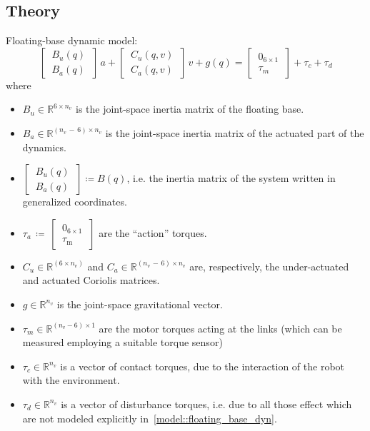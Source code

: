 \documentclass[letterpaper, 10 pt, conference]{ieeeconf}  %
\begin{document}
\subsection{Theory}
Floating-base dynamic model:
\begin{equation}\label{model::floating_base_dyn}
\begin{bmatrix}
~B_u(q)~\\
~B_a(q)~
\end{bmatrix}\,a + \begin{bmatrix}
~C_u(q, v)~\\
~C_a(q, v)~
\end{bmatrix}\,v + g(q) = \begin{bmatrix}
~0_{6\times 1}~\\
~\tau_{m}~
\end{bmatrix} + \tau_{c} + \tau_{d}
\end{equation}
where
\begin{itemize}
\item $B_u\in\mathbb{R}^{6\times n_v}$ is the joint-space inertia matrix of the floating base.
\item $B_a\in\mathbb{R}^{\left(n_v\,-\,6\right)\times n_v}$ is the joint-space inertia matrix of the actuated part of the dynamics.
\item $\begin{bmatrix}
~B_u(q)~\\
~B_a(q)~
\end{bmatrix}\coloneqq B(q)$, i.e. the inertia matrix of the system written in generalized coordinates.
\item $\tau_a\,\coloneqq\,\begin{bmatrix}
~0_{6\times 1}~\\
~\tau_{\mathrm{m}}~ 
\end{bmatrix}$ are the \enquote{action} torques. 
\item $C_u\in \mathbb{R}^{(6\times n_v)}$ and $C_a\in \mathbb{R}^{\left(n_v\,-\,6\right)\times n_v}$ are, respectively, the under-actuated and actuated Coriolis matrices. 
\item $g\in \mathbb{R}^{n_v}$ is the joint-space gravitational vector.
\item $\tau_m\in \mathbb{R}^{\left(n_v - 6\right)\times 1}$ are the motor torques acting at the links (which can be measured employing a suitable torque sensor)
\item $\tau_{c}\in \mathbb{R}^{n_v}$ is a vector of contact torques, due to the interaction of the robot with the environment.
\item $\tau_{d}\in \mathbb{R}^{n_v}$ is a vector of disturbance torques, i.e. due to all those effect which are not modeled explicitly in~\eqref{model::floating_base_dyn}.
\end{itemize}
\end{document}

